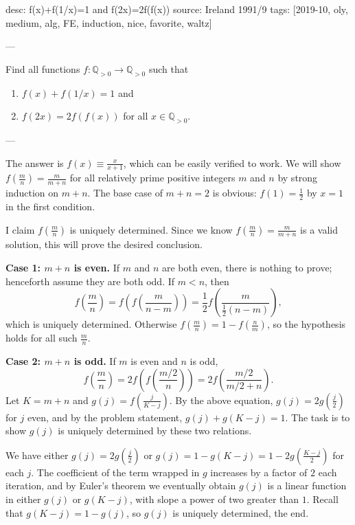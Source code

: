 desc: f(x)+f(1/x)=1 and f(2x)=2f(f(x))
source: Ireland 1991/9
tags: [2019-10, oly, medium, alg, FE, induction, nice, favorite, waltz]

---

Find all functions $f:\mathbb Q_{>0}\to\mathbb Q_{>0}$ such that
\begin{enumerate}[label=(\roman*),itemsep=0em]
    \item $f(x)+f(1/x)=1$ and
    \item $f(2x)=2f(f(x))$ for all $x\in\mathbb Q_{>0}$.
\end{enumerate}

---

The answer is $f(x)\equiv\tfrac x{x+1}$, which can be easily verified to work. We will show $f(\tfrac mn)=\frac m{m+n}$ for all relatively prime positive integers $m$ and $n$ by strong induction on $m+n$. The base case of $m+n=2$ is obvious: $f(1)=\tfrac12$ by $x=1$ in the first condition.

I claim $f(\tfrac mn)$ is uniquely determined. Since we know $f(\tfrac mn)=\tfrac m{m+n}$ is a valid solution, this will prove the desired conclusion.

\bigskip

\textbf{Case 1: $m+n$ is even.}     If $m$ and $n$ are both even, there is nothing to prove; henceforth assume they are both odd. If $m<n$, then \[f\left(\frac mn\right)=f\left(f\left(\frac m{n-m}\right)\right)=\frac12f\left(\frac m{\frac12(n-m)}\right),\]
which is uniquely determined. Otherwise $f(\tfrac mn)=1-f(\tfrac nm)$, so the hypothesis holds for all such $\tfrac mn$.

\bigskip

\textbf{Case 2: $m+n$ is odd.}     If $m$ is even and $n$ is odd, \[f\left(\frac mn\right)=2f\left(f\left(\frac{m/2}n\right)\right)=2f\left(\frac{m/2}{m/2+n}\right).\]
Let $K=m+n$ and $g(j)=f(\tfrac j{K-j})$. By the above equation, $g(j)=2g(\tfrac j2)$ for $j$ even, and by the problem statement, $g(j)+g(K-j)=1$. The task is to show $g(j)$ is uniquely determined by these two relations.

We have either $g(j)=2g(\tfrac j2)$ or $g(j)=1-g(K-j)=1-2g(\tfrac{K-j}2)$ for each $j$. The coefficient of the term wrapped in $g$ increases by a factor of $2$ each iteration, and by Euler's theorem we eventually obtain $g(j)$ is a linear function in either $g(j)$ or $g(K-j)$, with slope a power of two greater than $1$. Recall that $g(K-j)=1-g(j)$, so $g(j)$ is uniquely determined, the end.

